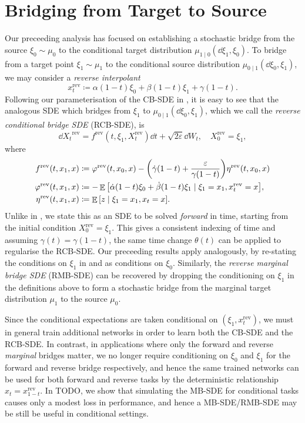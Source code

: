 \section{Bridging from Target to Source}
Our preceeding analysis has focused on establishing a stochastic bridge from the source \(\xi_{0} \sim \mu_{0}\) to the conditional target distribution \(\mu_{1 \mid 0}(\dd{\xi_{1}}, \xi_{0})\). To bridge from a target point \(\xi_{1} \sim \mu_{1}\) to the conditional source distribution \(\mu_{0 \mid 1}(\dd{\xi_{0}}, \xi_{1})\), we may consider a \textit{reverse interpolant}
\[
  x_{t}^{\text{rev}} \coloneqq \alpha(1-t) \xi_{0} + \beta(1-t) \xi_{1} + \gamma(1-t).
\]
Following our parameterisation of the CB-SDE in , it is easy to see that the analogous SDE which bridges from \(\xi_{1}\) to \(\mu_{0 \mid 1}(\dd{\xi_{0}}, \xi_{1})\), which we call the \textit{reverse conditional bridge SDE} (RCB-SDE), is
\[
  \dd{X_{t}}^{\text{rev}} = f^{\text{rev}}(t, \xi_{1}, X_{t}^{\text{rev}}) \dd{t} + \sqrt{2\varepsilon}\dd{W_{t}}, \quad X_{0}^{\text{rev}} = \xi_{1},
\]
where
\begin{align*}
  f^{\text{rev}}(t, x_{1}, x) &\coloneqq \varphi^{\text{rev}}(t, x_{0}, x) - \qty( \dot{\gamma}(1-t) + \frac{\varepsilon}{\gamma(1-t)} ) \eta^{\text{rev}}(t, x_{0}, x) \\
  \varphi^{\text{rev}}(t, x_{1}, x) &\coloneqq -\mathop{\mathbb{E}}\qty[\dot{\alpha}(1-t) \xi_{0} + \dot{\beta}(1-t) \xi_{1} \mid \xi_{1} = x_{1}, x^{\text{rev}}_{t} = x], \\
  \eta^{\text{rev}}(t, x_{1}, x) &\coloneqq \mathop{\mathbb{E}}\qty[z \mid \xi_{1} = x_{1}, x_{t} = x].
\end{align*}
Unlike in \citet{albergo2023stochasticinterpolantsunifyingframework}, we state this as an SDE to be solved \textit{forward} in time, starting from the initial condition \(X_{0}^{\text{rev}} = \xi_{1}\). This gives a consistent indexing of time and assuming \(\gamma(t) = \gamma(1-t)\), the same time change \(\theta(t)\) can be applied to regularise the RCB-SDE. Our preceeding results apply analogously, by re-stating the conditions on \(\xi_{1}\) in  and  as conditions on \(\xi_{0}\). Similarly, the \textit{reverse marginal bridge SDE} (RMB-SDE) can be recovered by dropping the conditioning on \(\xi_{1}\) in the definitions above to form a stochastic bridge from the marginal target distribution \(\mu_{1}\) to the source \(\mu_{0}\).

Since the conditional expectations are taken conditional on \((\xi_{1}, x^{\text{rev}}_{t})\), we must in general train additional networks in order to learn both the CB-SDE and the RCB-SDE. In contrast, in applications where only the forward and reverse \textit{marginal} bridges matter, we no longer require conditioning on \(\xi_{0}\) and \(\xi_{1}\)  for the forward and reverse bridge respectively, and hence the same trained networks can be used for both forward and reverse tasks by the deterministic relationship \(x_{t} = x_{1-t}^{\text{rev}}\). In  TODO, we show that simulating the MB-SDE for conditional tasks causes only a modest loss in performance, and hence a MB-SDE/RMB-SDE may be still be useful in conditional settings.

